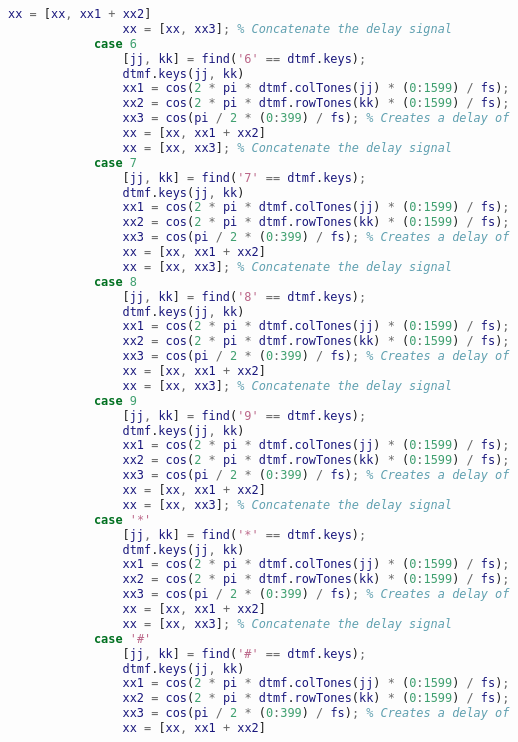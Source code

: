 \begin{lstlisting}[language=Matlab]
                xx = [xx, xx1 + xx2]
                xx = [xx, xx3]; % Concatenate the delay signal
            case 6
                [jj, kk] = find('6' == dtmf.keys);
                dtmf.keys(jj, kk)
                xx1 = cos(2 * pi * dtmf.colTones(jj) * (0:1599) / fs);
                xx2 = cos(2 * pi * dtmf.rowTones(kk) * (0:1599) / fs);
                xx3 = cos(pi / 2 * (0:399) / fs); % Creates a delay of 0.05 secs
                xx = [xx, xx1 + xx2]
                xx = [xx, xx3]; % Concatenate the delay signal
            case 7
                [jj, kk] = find('7' == dtmf.keys);
                dtmf.keys(jj, kk)
                xx1 = cos(2 * pi * dtmf.colTones(jj) * (0:1599) / fs);
                xx2 = cos(2 * pi * dtmf.rowTones(kk) * (0:1599) / fs);
                xx3 = cos(pi / 2 * (0:399) / fs); % Creates a delay of 0.05 secs
                xx = [xx, xx1 + xx2]
                xx = [xx, xx3]; % Concatenate the delay signal
            case 8
                [jj, kk] = find('8' == dtmf.keys);
                dtmf.keys(jj, kk)
                xx1 = cos(2 * pi * dtmf.colTones(jj) * (0:1599) / fs);
                xx2 = cos(2 * pi * dtmf.rowTones(kk) * (0:1599) / fs);
                xx3 = cos(pi / 2 * (0:399) / fs); % Creates a delay of 0.05 secs
                xx = [xx, xx1 + xx2]
                xx = [xx, xx3]; % Concatenate the delay signal
            case 9
                [jj, kk] = find('9' == dtmf.keys);
                dtmf.keys(jj, kk)
                xx1 = cos(2 * pi * dtmf.colTones(jj) * (0:1599) / fs);
                xx2 = cos(2 * pi * dtmf.rowTones(kk) * (0:1599) / fs);
                xx3 = cos(pi / 2 * (0:399) / fs); % Creates a delay of 0.05 secs
                xx = [xx, xx1 + xx2]
                xx = [xx, xx3]; % Concatenate the delay signal
            case '*'
                [jj, kk] = find('*' == dtmf.keys);
                dtmf.keys(jj, kk)
                xx1 = cos(2 * pi * dtmf.colTones(jj) * (0:1599) / fs);
                xx2 = cos(2 * pi * dtmf.rowTones(kk) * (0:1599) / fs);
                xx3 = cos(pi / 2 * (0:399) / fs); % Creates a delay of 0.05 secs
                xx = [xx, xx1 + xx2]
                xx = [xx, xx3]; % Concatenate the delay signal
            case '#'
                [jj, kk] = find('#' == dtmf.keys);
                dtmf.keys(jj, kk)
                xx1 = cos(2 * pi * dtmf.colTones(jj) * (0:1599) / fs);
                xx2 = cos(2 * pi * dtmf.rowTones(kk) * (0:1599) / fs);
                xx3 = cos(pi / 2 * (0:399) / fs); % Creates a delay of 0.05 secs
                xx = [xx, xx1 + xx2]

\end{lstlisting}
